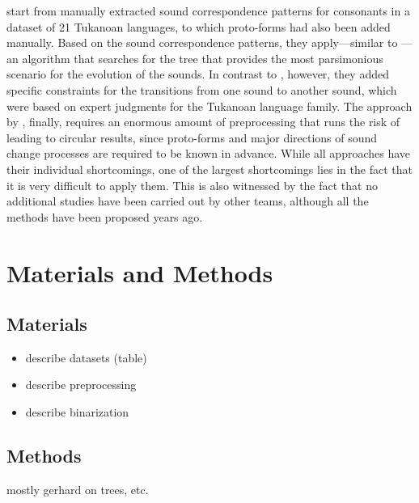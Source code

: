 \documentclass[10pt, a4paper]{article}
\begin{document}
 
\citet{Chacon2015a} start from manually extracted sound correspondence patterns for consonants in a dataset of 21 Tukanoan languages, to which proto-forms had also been added manually. Based on the sound correspondence patterns, they apply---similar to \citet{Wheeler2015b}---an algorithm that searches for the tree that provides the most parsimonious scenario for the evolution of the sounds. In contrast to \citet{Wheeler2015b}, however, they added specific constraints for the transitions from one sound to another sound, which were based on expert judgments for the Tukanoan language family. The approach by \citet{Chacon2015a}, finally, requires an enormous amount of preprocessing that runs the risk of leading to circular results, since proto-forms and major directions of sound change processes are required to be known in advance. While all approaches have their individual shortcomings, one of the largest shortcomings lies in the fact that it is very difficult to apply them. This is also witnessed by the fact that no additional studies have been carried out by other teams, although all the methods have been proposed years ago.


\section{Materials and Methods}

\subsection{Materials}

\begin{itemize}
\item describe datasets (table)
\item describe preprocessing 
\item describe binarization 
\end{itemize}


\subsection{Methods}

mostly gerhard on trees, etc.
\end{document}
